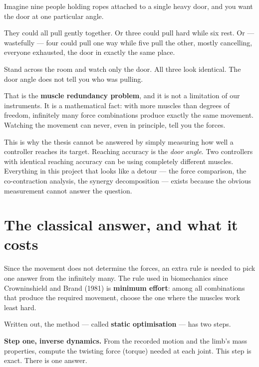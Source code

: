 \begin{plain}
Imagine nine people holding ropes attached to a single heavy door, and you want
the door at one particular angle.

They could all pull gently together. Or three could pull hard while six rest. Or
--- wastefully --- four could pull one way while five pull the other, mostly
cancelling, everyone exhausted, the door in exactly the same place.

Stand across the room and watch only the door. All three look identical. The door
angle does not tell you who was pulling.
\end{plain}

That is the \textbf{muscle redundancy problem}, and it is not a limitation of our
instruments. It is a mathematical fact: with more muscles than degrees of
freedom, infinitely many force combinations produce exactly the same movement.
Watching the movement can never, even in principle, tell you the forces.

\begin{why}
This is why the thesis cannot be answered by simply measuring how well a
controller reaches its target. Reaching accuracy is the \emph{door angle}. Two
controllers with identical reaching accuracy can be using completely different
muscles. Everything in this project that looks like a detour --- the force
comparison, the co-contraction analysis, the synergy decomposition --- exists
because the obvious measurement cannot answer the question.
\end{why}

\section{The classical answer, and what it costs}

Since the movement does not determine the forces, an extra rule is needed to pick
one answer from the infinitely many. The rule used in biomechanics since
Crowninshield and Brand (1981) is \textbf{minimum effort}: among all combinations
that produce the required movement, choose the one where the muscles work least
hard.

Written out, the method --- called \textbf{static optimisation} --- has two steps.

\textbf{Step one, inverse dynamics.} From the recorded motion and the limb's mass
properties, compute the twisting force (torque) needed at each joint. This step
is exact. There is one answer.

